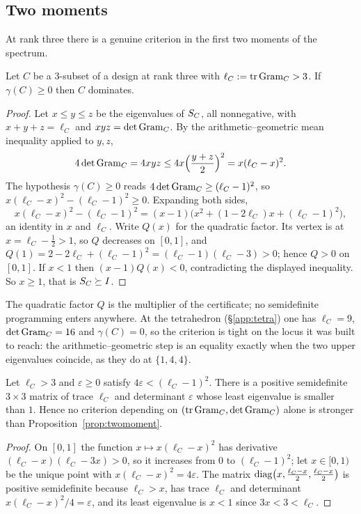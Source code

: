 \subsection{Two moments}\label{app:moments}

At rank three there is a genuine criterion in the first two moments of the
spectrum.

\begin{proposition}[Lean]\label{prop:twomoment}
Let $C$ be a $3$-subset of a design at rank three with
$\ell_C:=\operatorname{tr}\operatorname{Gram}_C>3$.  If $\gamma(C)\ge0$ then $C$ dominates.
\end{proposition}

\begin{proof}
Let $x\le y\le z$ be the eigenvalues of $S_{C}$, all nonnegative, with
$x+y+z=\ell_C$ and $xyz=\det\operatorname{Gram}_C$.  By the arithmetic--geometric mean
inequality applied to $y,z$,
\[
  4\det\operatorname{Gram}_C=4xyz\le 4x\Bigl(\frac{y+z}{2}\Bigr)^2=x(\ell_C-x)^2 .
\]
The hypothesis $\gamma(C)\ge0$ reads $4\det\operatorname{Gram}_C\ge(\ell_C-1)^2$, so
$x(\ell_C-x)^2-(\ell_C-1)^2\ge0$.  Expanding both sides,
\[
  x(\ell_C-x)^2-(\ell_C-1)^2=(x-1)\bigl(x^2+(1-2\ell_C)x+(\ell_C-1)^2\bigr),
\]
an identity in $x$ and $\ell_C$.  Write $Q(x)$ for the quadratic factor.  Its vertex
is at $x=\ell_C-\tfrac12>1$, so $Q$ decreases on $[0,1]$, and
$Q(1)=2-2\ell_C+(\ell_C-1)^2=(\ell_C-1)(\ell_C-3)>0$; hence $Q>0$ on $[0,1]$.  If $x<1$ then
$(x-1)Q(x)<0$, contradicting the displayed inequality.  So $x\ge1$, that is
$S_{C}\succeq I$.
\end{proof}

The quadratic factor $Q$ is the multiplier of the certificate; no
semidefinite programming enters anywhere.  At the tetrahedron
(\S\ref{app:tetra}) one has $\ell_C=9$, $\det\operatorname{Gram}_C=16$ and
$\gamma(C)=0$, so the criterion is tight on the locus it was built
to reach: the arithmetic--geometric step is an equality exactly when the
two upper eigenvalues coincide, as they do at $\{1,4,4\}$.

\begin{proposition}\label{prop:momentsharp}
Let $\ell_C>3$ and $\varepsilon\ge0$ satisfy $4\varepsilon<(\ell_C-1)^2$.
There is a positive semidefinite $3\times3$ matrix of trace $\ell_C$ and
determinant $\varepsilon$ whose least eigenvalue is smaller than $1$.  Hence
no criterion depending on $(\operatorname{tr}\operatorname{Gram}_C,\det\operatorname{Gram}_C)$ alone is stronger than
Proposition~\ref{prop:twomoment}.
\end{proposition}

\begin{proof}
On $[0,1]$ the function $x\mapsto x(\ell_C-x)^2$ has derivative $(\ell_C-x)(\ell_C-3x)>0$, so
it increases from $0$ to $(\ell_C-1)^2$; let $x\in[0,1)$ be the unique point with
$x(\ell_C-x)^2=4\varepsilon$.  The matrix
$\operatorname{diag}\bigl(x,\tfrac{\ell_C-x}{2},\tfrac{\ell_C-x}{2}\bigr)$
is positive semidefinite because $\ell_C>x$, has trace $\ell_C$ and determinant
$x(\ell_C-x)^2/4=\varepsilon$, and its least eigenvalue is $x<1$ since $3x<3<\ell_C$.
\end{proof}

